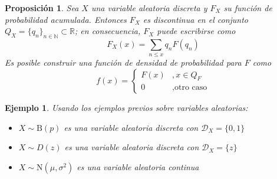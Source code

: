\documentclass[12pt,letterpaper]{book}
\newtheorem{proposicion}[teorema]{Proposición}
\newtheorem{ejemplo}{Ejemplo}[chapter]
\newcommand{\R}{\mathbb{R}}
\newcommand{\N}{\mathbb{N}}
\begin{document}
\begin{proposicion}
Sea $X$ una variable aleatoria discreta y $F_X$ su función de probabilidad acumulada.
%
Entonces $F_X$ es discontinua en el conjunto $Q_X=\{q_n\}_{n\in \N} \subset \R$; en consecuencia, $F_X$ puede escribirse como 
\begin{equation}
F_X(x) = \sum_{n\leq x} q_n F({q_n})
\end{equation}
Es posible construir una función de densidad de probabilidad para $F$ como
\begin{equation}
f(x) = \begin{cases}
F({x}) &, x\in Q_F \\
0 &, \text{otro caso}
\end{cases}
\end{equation}
\end{proposicion}

\begin{ejemplo}
Usando los ejemplos previos sobre variables aleatorias:
\begin{itemize}
\item $X\sim \text{B}(p)$ es una variable aleatoria discreta con $\mathcal{D}_X = \{0,1\}$
\item $X\sim D(z)$ es una variable aleatoria discreta con $\mathcal{D}_X = \{z\}$
\item $X\sim \text{N}(\mu,\sigma^{2})$ es una variable aleatoria continua
\end{itemize}
\end{ejemplo}
\end{document}
